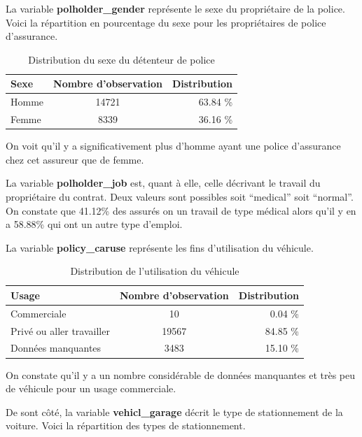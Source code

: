 \documentclass[
]{article}
\begin{document}
La variable \textbf{polholder\_gender} représente le sexe du
propriétaire de la police. Voici la répartition en pourcentage du sexe
pour les propriétaires de police d'assurance.

\begin{table}[ht]
\centering
\caption{Distribution du sexe du détenteur de police} 
\label{tbl:polholderGender}
\begin{tabular}{lcr}
  \hline
Sexe & Nombre d'observation & Distribution \\ 
  \hline
Homme & 14721 & 63.84 \% \\ 
  Femme & 8339 & 36.16 \% \\ 
   \hline
\end{tabular}
\end{table}

On voit qu'il y a significativement plus d'homme ayant une police
d'assurance chez cet assureur que de femme.

La variable \textbf{polholder\_job} est, quant à elle, celle décrivant
le travail du propriétaire du contrat. Deux valeurs sont possibles soit
``medical'' soit ``normal''. On constate que 41.12\% des assurés on un
travail de type médical alors qu'il y en a 58.88\% qui ont un autre type
d'emploi.

La variable \textbf{policy\_caruse} représente les fins d'utilisation du
véhicule.

\begin{table}[ht]
\centering
\caption{Distribution de l'utilisation du véhicule} 
\label{tbl:policyCaruse}
\begin{tabular}{lcr}
  \hline
Usage & Nombre d'observation & Distribution \\ 
  \hline
Commerciale & 10 & 0.04 \% \\ 
  Privé ou aller travailler & 19567 & 84.85 \% \\ 
  Données manquantes & 3483 & 15.10 \% \\ 
   \hline
\end{tabular}
\end{table}

On constate qu'il y a un nombre considérable de données manquantes et
très peu de véhicule pour un usage commerciale.

De sont côté, la variable \textbf{vehicl\_garage} décrit le type de
stationnement de la voiture. Voici la répartition des types de
stationnement.
\end{document}
